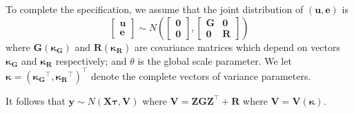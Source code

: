 \documentclass{sydneythesis}
\theoremstyle{definition}
\theoremstyle{definition}
\theoremstyle{definition}
\theoremstyle{remark}
\begin{document}
To complete the specification, we assume that the joint distribution of
\((\boldsymbol{u}, \boldsymbol{e})\) is \[ \begin{bmatrix}
\boldsymbol{u} \\
\boldsymbol{e} 
\end{bmatrix}
\sim N \left( 
\begin{bmatrix}
\boldsymbol{0} \\
\boldsymbol{0} 
\end{bmatrix}, 
\begin{bmatrix}
\boldsymbol{G} & \boldsymbol{0} \\
\boldsymbol{0} & \boldsymbol{R} 
\end{bmatrix}
\right)
\] where \(\boldsymbol{G}(\boldsymbol{\kappa_G})\) and
\(\boldsymbol{R}(\boldsymbol{\kappa_R})\) are covariance matrices which
depend on vectors \(\boldsymbol{\kappa_G}\) and
\(\boldsymbol{\kappa_R}\) respectively; and \(\theta\) is the global
scale parameter. We let
\(\boldsymbol{\kappa} = (\boldsymbol{\kappa_G}^\top, \boldsymbol{\kappa_R}^\top)^\top\)
denote the complete vectors of variance parameters.

It follows that
\(\boldsymbol{y} \sim N(\boldsymbol{X\tau}, \boldsymbol{V})\) where
\(\boldsymbol{V} = \boldsymbol{ZGZ}^\top + \boldsymbol{R}\) where
\(\boldsymbol{V}=\boldsymbol{V}(\boldsymbol{\kappa})\).

\printbibliography[heading=bibintoc]
\end{document}
